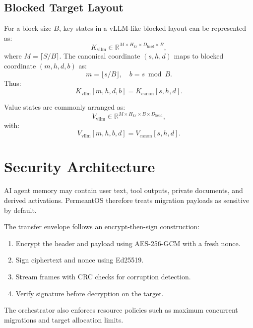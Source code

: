 \documentclass[11pt]{article}
\begin{document}
\subsection{Blocked Target Layout}

For a block size $B$, key states in a vLLM-like blocked layout can be represented as:
\begin{equation}
K_{\text{vllm}} \in \mathbb{R}^{M \times H_{\text{kv}} \times D_{\text{head}} \times B},
\end{equation}
where $M = \lceil S / B \rceil$. The canonical coordinate $(s,h,d)$ maps to blocked coordinate $(m,h,d,b)$ as:
\begin{equation}
m = \lfloor s / B \rfloor, \quad b = s \bmod B.
\end{equation}
Thus:
\begin{equation}
K_{\text{vllm}}[m,h,d,b] = K_{\text{canon}}[s,h,d].
\end{equation}

Value states are commonly arranged as:
\begin{equation}
V_{\text{vllm}} \in \mathbb{R}^{M \times H_{\text{kv}} \times B \times D_{\text{head}}},
\end{equation}
with:
\begin{equation}
V_{\text{vllm}}[m,h,b,d] = V_{\text{canon}}[s,h,d].
\end{equation}

\section{Security Architecture}

AI agent memory may contain user text, tool outputs, private documents, and derived activations. PermeantOS therefore treats migration payloads as sensitive by default.

The transfer envelope follows an encrypt-then-sign construction:
\begin{enumerate}[leftmargin=*]
  \item Encrypt the header and payload using AES-256-GCM with a fresh nonce.
  \item Sign ciphertext and nonce using Ed25519.
  \item Stream frames with CRC checks for corruption detection.
  \item Verify signature before decryption on the target.
\end{enumerate}

The orchestrator also enforces resource policies such as maximum concurrent migrations and target allocation limits.
\end{document}
